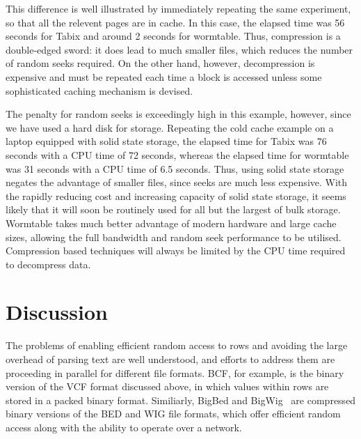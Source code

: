 \documentclass[10pt]{bmc_article}
\newenvironment{bmcformat}{\begin{raggedright}\baselineskip20pt\sloppy\setboolean{publ}{false}}{\end{raggedright}\baselineskip20pt\sloppy}
\begin{document}
\begin{bmcformat}
This difference is well illustrated by immediately repeating 
the same experiment, so that all the relevent pages are 
in cache. In this case, the elapsed time was 56 seconds for Tabix and around 
2 seconds for wormtable. Thus, compression is a double-edged sword: 
it does lead to much smaller files, which reduces the number of random seeks 
required.  On the other hand, however, decompression is expensive and must 
be repeated each time a block is accessed unless some sophisticated
caching mechanism is devised. 

The penalty for random seeks is exceedingly high in this 
example, however, since we have used a hard disk for storage.
Repeating the cold cache example on a laptop equipped with 
solid state storage, the elapsed time for Tabix was 76 seconds
with a CPU time of 72 seconds, whereas the elapsed time for 
wormtable was 31 seconds with a CPU time of 6.5 seconds. Thus, using 
solid state storage negates the advantage of smaller files, since 
seeks are much less expensive.  
 With the rapidly reducing cost and 
increasing capacity of solid state storage, it seems likely 
that it will soon be routinely used for all but the largest 
of bulk storage. Wormtable takes much better advantage of
modern hardware and large cache sizes, allowing the full bandwidth 
and random seek performance to be utilised. Compression based 
techniques will always be limited by the CPU time required to 
decompress data.



\section*{Discussion}
The problems of enabling efficient random access to rows and 
avoiding the large overhead of parsing text are well understood, 
and efforts to address them are proceeding in parallel for 
different file formats. 
BCF, for example, is the binary version of the VCF format discussed 
above, in which values within rows are stored in a packed binary 
format.  Similiarly, BigBed and 
BigWig~\cite{kzbhk10} are compressed binary versions of the BED 
and WIG file formats, which offer efficient random access along 
with the ability to operate over a network. 


\end{bmcformat}
\end{document}
